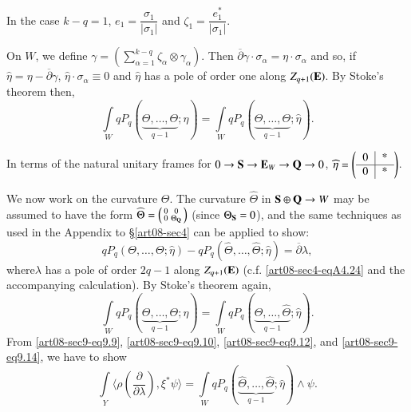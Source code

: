 \begin{remark*}
In the case $k-q=1$, $e_{1}=\dfrac{\sigma_{1}}{|\sigma_{1}|}$ and $\zeta_{1}=\dfrac{e^{*}_{1}}{|\sigma_{1}|}$.
\end{remark*}

On $W$, we define $\gamma=\left(\sum\limits^{k-q}_{\alpha=1}\zeta_{\alpha}\otimes \gamma_{\alpha}\right)$. Then $\overline{\partial}\gamma\cdot \sigma_{\alpha}=\eta\cdot \sigma_{\alpha}$ and so, if $\widehat{\eta}=\eta-\overline{\partial}\gamma$, $\widehat{\eta}\cdot \sigma_{\alpha}\equiv 0$ and $\widehat{\eta}$ has a pole of order one along $Z_{q+1}(\mathbf{E})$. By Stoke's theorem then,
\begin{equation*}
\int\limits_{W}qP_{q}(\underbrace{\Theta,\ldots,\Theta}_{q-1};\eta)=\int\limits_{W}qP_{q}(\underbrace{\Theta,\ldots,\Theta}_{q-1};\widehat{\eta}).\tag{9.12}\label{art08-sec9-eq9.12}
\end{equation*}

In terms of the natural unitary frames for $0\to \mathbf{S}\to \mathbf{E}_{W}\to \mathbf{Q}\to 0$, $\widehat{\eta}=\left(\begin{tabular}{c|c} 0 & *\\\hline 0 & *\end{tabular}\right)$.

We now work on the curvature $\Theta$. The curvature $\widehat{\Theta}$ in $\mathbf{S}\oplus \mathbf{Q}\to W$ may be assumed to have the form $\widehat{\Theta}=\left(\begin{smallmatrix} 0 & 0\\ 0 & \Theta_{\mathbf{Q}}\end{smallmatrix}\right)$ (since $\Theta_{\mathbf{S}}=0$), and the same techniques as used in the Appendix to \S\ref{art08-sec4} can be applied to show:
\begin{equation*}
qP_{q}(\Theta,\ldots,\Theta;\widehat{\eta})-qP_{q}(\widehat{\Theta},\ldots,\widehat{\Theta};\widehat{\eta})=\overline{\partial}\lambda,\tag{9.13}\label{art08-sec9-eq9.13}
\end{equation*}
where\pageoriginale $\lambda$ has a pole of order $2q-1$ along $Z_{q+1}(\mathbf{E})$ (c.f. \eqref{art08-sec4-eqA4.24} and the accompanying calculation). By Stoke's theorem again,
\begin{equation*}
\int\limits_{W}qP_{q}(\underbrace{\Theta,\ldots,\Theta}_{q-1};\widehat{\eta})=\int\limits_{W}qP_{q}(\underbrace{\widehat{\Theta},\ldots,\widehat{\Theta}}_{q-1};\widehat{\eta}).\tag{9.14}\label{art08-sec9-eq9.14}
\end{equation*}
From \eqref{art08-sec9-eq9.9}, \eqref{art08-sec9-eq9.10}, \eqref{art08-sec9-eq9.12}, and \eqref{art08-sec9-eq9.14}, we have to show
\begin{equation*}
\int\limits_{Y}\langle \rho\left(\frac{\partial}{\partial\lambda}\right), \xi^{*}\psi\rangle =\int\limits_{W}qP_{q}(\underbrace{\widehat{\Theta},\ldots,\widehat{\Theta}}_{q-1};\widehat{\eta})\wedge \psi.\tag{9.15}\label{art08-sec9-eq9.15}
\end{equation*}

